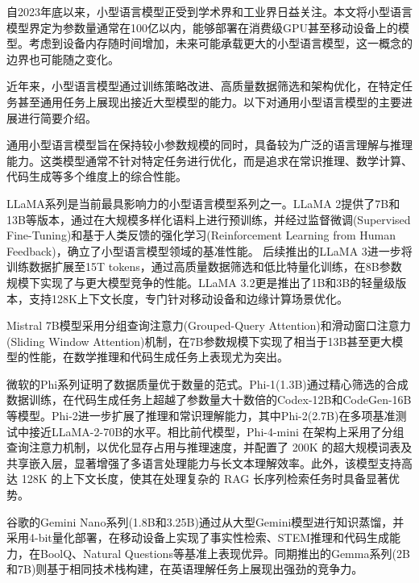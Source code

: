 \documentclass[promaster, vlined]{DissertUESTC}
\begin{document}
自2023年底以来，小型语言模型正受到学术界和工业界日益关注。本文将小型语言模型界定为参数量通常在100亿以内，能够部署在消费级GPU甚至移动设备上的模型\cite{subramanian2025small,wang2025comprehensive,lu2025smalllanguagemodelssurvey}。考虑到设备内存随时间增加，未来可能承载更大的小型语言模型，这一概念的边界也可能随之变化。

近年来，小型语言模型通过训练策略改进、高质量数据筛选和架构优化，在特定任务甚至通用任务上展现出接近大型模型的能力。以下对通用小型语言模型的主要进展进行简要介绍。

通用小型语言模型旨在保持较小参数规模的同时，具备较为广泛的语言理解与推理能力。这类模型通常不针对特定任务进行优化，而是追求在常识推理、数学计算、代码生成等多个维度上的综合性能。

LLaMA系列是当前最具影响力的小型语言模型系列之一。LLaMA 2提供了7B和13B等版本，通过在大规模多样化语料上进行预训练，并经过监督微调(Supervised Fine-Tuning)和基于人类反馈的强化学习(Reinforcement Learning from Human Feedback)，确立了小型语言模型领域的基准性能\cite{touvron2023llama}。
后续推出的LLaMA 3进一步将训练数据扩展至15T tokens，通过高质量数据筛选和低比特量化训练，在8B参数规模下实现了与更大模型竞争的性能。LLaMA 3.2更是推出了1B和3B的轻量级版本，支持128K上下文长度，专门针对移动设备和边缘计算场景优化\cite{grattafiori2024llama3herdmodels}。

Mistral 7B模型采用分组查询注意力(Grouped-Query Attention)和滑动窗口注意力(Sliding Window Attention)机制，在7B参数规模下实现了相当于13B甚至更大模型的性能，在数学推理和代码生成任务上表现尤为突出\cite{jiang2023mistral7b}。

微软的Phi系列证明了数据质量优于数量的范式。Phi-1(1.3B)通过精心筛选的合成数据训练，在代码生成任务上超越了参数量大十数倍的Codex-12B和CodeGen-16B等模型\cite{gunasekar2023textbooks}。Phi-2进一步扩展了推理和常识理解能力，其中Phi-2(2.7B)在多项基准测试中接近LLaMA-2-70B的水平\cite{javaheripi2023phi}。相比前代模型，Phi-4-mini 在架构上采用了分组查询注意力机制，以优化显存占用与推理速度，并配置了 200K 的超大规模词表及共享嵌入层，显著增强了多语言处理能力与长文本理解效率。此外，该模型支持高达 128K 的上下文长度，使其在处理复杂的 RAG 长序列检索任务时具备显著优势\cite{microsoft2025phi4minitechnicalreportcompact}。

谷歌的Gemini Nano系列(1.8B和3.25B)通过从大型Gemini模型进行知识蒸馏，并采用4-bit量化部署，在移动设备上实现了事实性检索、STEM推理和代码生成能力，在BoolQ、Natural Questions等基准上表现优异\cite{team2023gemini}。同期推出的Gemma系列(2B和7B)则基于相同技术栈构建，在英语理解任务上展现出强劲的竞争力\cite{team2024gemma}。
\end{document}
